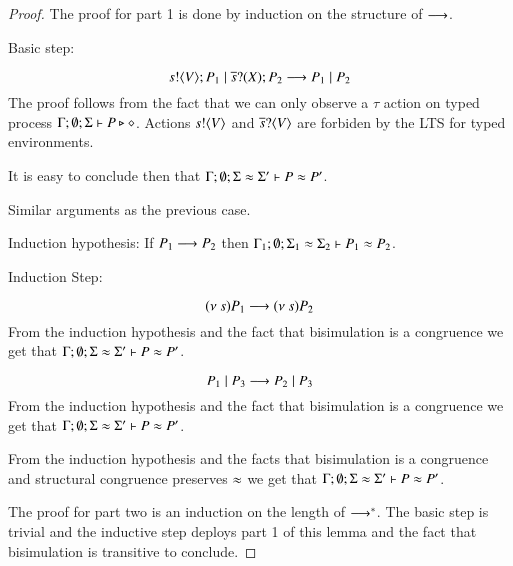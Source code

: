 \begin{proof}
	The proof for part 1 is done by induction on the structure of $\longrightarrow$.



%
%
	Basic step:

	\[
		s ! \langle V \rangle ; P_1 \;|\; \overline{s} ? (X) ; P_2 \longrightarrow P_1 \;|\; P_2
	\]
	The proof follows from the fact that we can only observe a $\tau$
	action on typed process
	$\Gamma; \emptyset; \Sigma \vdash P \triangleright \diamond$.
	Actions $s ! \langle V \rangle$ and $\overline{s} ? \langle V \rangle$
	are forbiden by the LTS for typed environments.

	It is easy to conclude then that $\Gamma; \emptyset; \Sigma \approx \Sigma' \vdash P \approx P'$.


	Similar arguments as the previous case.

	Induction hypothesis:
	If $P_1 \longrightarrow P_2$ then
	$\Gamma_1; \emptyset; \Sigma_1 \approx \Sigma_2 \vdash P_1 \approx P_2$.

	Induction Step:

	\[
		(\nu\ s){P_1} \longrightarrow (\nu\ s) P_2
	\]
	From the induction hypothesis and the fact that bisimulation is a congruence
	we get that $\Gamma; \emptyset; \Sigma \approx \Sigma' \vdash P \approx P'$.


	\[
		P_1 \;|\; P_3 \longrightarrow P_2 \;|\; P_3
	\]
	From the induction hypothesis and the fact that bisimulation is a congruence
	we get that $\Gamma; \emptyset; \Sigma \approx \Sigma' \vdash P \approx P'$.


	From the induction hypothesis and the facts that bisimulation is a congruence
	and structural congruence preserves $\approx$
	we get that $\Gamma; \emptyset; \Sigma \approx \Sigma' \vdash P \approx P'$.


	The proof for part two is an induction on the length of $\longrightarrow^*$.
	The basic step is trivial and the inductive step
	deploys part 1 of this lemma and the fact that bisimulation is
	transitive to conclude.
\end{proof}


